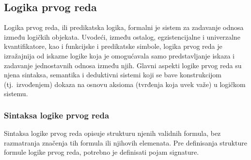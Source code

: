 \documentclass[a4paper,10pt]{article}
\begin{document}
\subsection{Logika prvog reda}
\label{subsec:logika_prvog_reda}

Logika prvog reda, ili predikatska logika, formalni je sistem za zadavanje odnosa između logičkih objekata. Uvodeći, između ostalog, egzistencijalne i univerzalne kvantifikatore, kao i funkcijske i predikatske simbole, logika prvog reda je izražajnija od iskazne logike koja je omogućavala samo predstavljanje iskaza i zadavanje jednostavnih odnosa između njih. Glavni aspekti logike prvog reda su njena sintaksa, semantika i deduktivni sistemi koji se bave konstrukcijom (tj.~izvođenjem) dokaza na osnovu aksioma (tvrđenja koja uvek važe) u logičkom sistemu.

\subsubsection{Sintaksa logike prvog reda}

Sintaksa logike prvog reda opisuje strukturu njenih validnih formula, bez razmatranja značenja tih formula ili njihovih elemenata. Pre definisanja strukture formule logike prvog reda, potrebno je definisati pojam signature.
\end{document}

